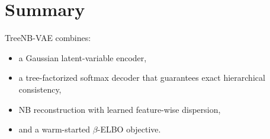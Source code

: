 \documentclass[11pt]{article}
\begin{document}
\section{Summary}
TreeNB-VAE combines:
\begin{itemize}
  \item a Gaussian latent-variable encoder,
  \item a tree-factorized softmax decoder that guarantees exact hierarchical consistency,
  \item NB reconstruction with learned feature-wise dispersion,
  \item and a warm-started $\beta$-ELBO objective.
\end{itemize}
\end{document}
